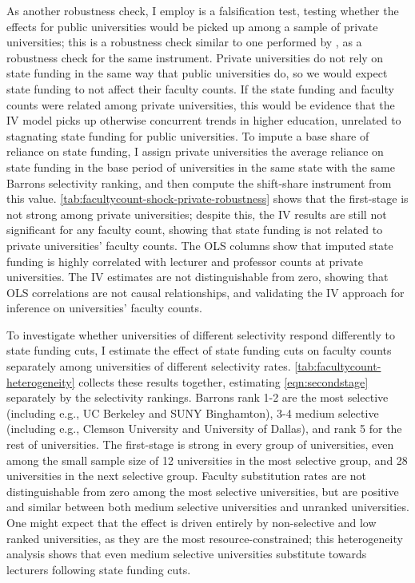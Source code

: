 As another robustness check, I employ is a falsification test, testing whether the effects for public universities would be picked up among a sample of private universities; this is a robustness check similar to one performed by \cite{NBERw27885}, as a robustness check for the same instrument.
Private universities do not rely on state funding in the same way that public universities do, so we would expect state funding to not affect their faculty counts.
If the state funding and faculty counts were related among private universities, this would be evidence that the IV model picks up otherwise concurrent trends in higher education, unrelated to stagnating state funding for public universities.
To impute a base share of reliance on state funding, I assign private universities the average reliance on state funding in the base period of universities in the same state with the same Barrons selectivity ranking, and then compute the shift-share instrument from this value.
\autoref{tab:facultycount-shock-private-robustness} shows that the first-stage is not strong among private universities; despite this, the IV results are still not significant for any faculty count, showing that state funding is not related to private universities' faculty counts.
The OLS columns show that imputed state funding is highly correlated with lecturer and professor counts at private universities.
The IV estimates are not distinguishable from zero, showing that OLS correlations are not causal relationships, and validating the IV approach for inference on universities' faculty counts.

To investigate whether universities of different selectivity respond differently to state funding cuts, I estimate the effect of state funding cuts on faculty counts separately among universities of different selectivity rates.
\autoref{tab:facultycount-heterogeneity} collects these results together, estimating \autoref{eqn:secondstage} separately by the \cite{barrons2009} selectivity rankings.
Barrons rank 1-2 are the most selective (including e.g., UC Berkeley and SUNY Binghamton), 3-4 medium selective (including e.g., Clemson University and University of Dallas), and rank 5 for the rest of universities.
The first-stage is strong in every group of universities, even among the small sample size of 12 universities in the most selective group, and 28 universities in the next selective group.
Faculty substitution rates are not distinguishable from zero among the most selective universities, but are positive and similar between both medium selective universities and unranked universities.
One might expect that the effect is driven entirely by non-selective and low ranked universities, as they are the most resource-constrained;
this heterogeneity analysis shows that even medium selective universities substitute towards lecturers following state funding cuts.

